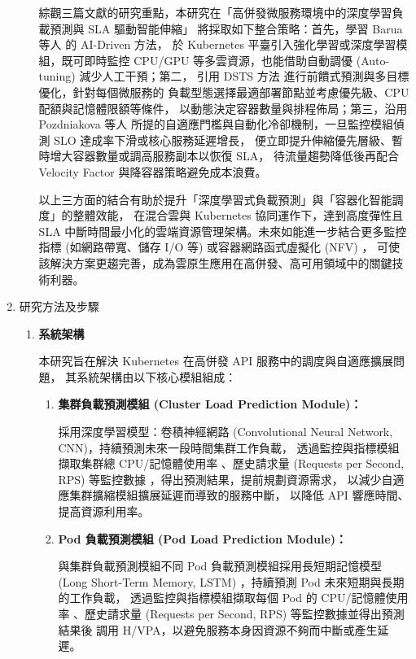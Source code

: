 \documentclass[12pt,a4paper]{article}
\begin{document}
\begin{enumerate}[label={(\zhdig*)}, leftmargin=2\parindent, listparindent=\parindent]
\begin{enumerate}[label={(\arabic*)}, leftmargin=\parindent, listparindent=\parindent]
綜觀三篇文獻的研究重點，本研究在「高併發微服務環境中的深度學習負載預測與 SLA 驅動智能伸縮」
將採取如下整合策略：首先，學習 Barua 等人\cite{22} 的 AI-Driven 方法，
於 Kubernetes 平臺引入強化學習或深度學習模組，既可即時監控 CPU/GPU
等多雲資源，也能借助自動調優 (Auto-tuning) 減少人工干預；第二，
引用 DSTS 方法\cite{24} 進行前饋式預測與多目標優化，針對每個微服務的
負載型態選擇最適部署節點並考慮優先級、CPU 配額與記憶體限額等條件，
以動態決定容器數量與排程佈局；第三，沿用 Pozdniakova 等人\cite{23}
所提的自適應門檻與自動化冷卻機制，一旦監控模組偵測 SLO 達成率下滑或核心服務延遲增長，
便立即提升伸縮優先層級、暫時增大容器數量或調高服務副本以恢復 SLA，
待流量趨勢降低後再配合 Velocity Factor 與降容器策略避免成本浪費。

以上三方面的結合有助於提升「深度學習式負載預測」與「容器化智能調度」的整體效能，
在混合雲與 Kubernetes 協同運作下，達到高度彈性且 SLA
中斷時間最小化的雲端資源管理架構。未來如能進一步結合更多監控指標
(如網路帶寬、儲存 I/O 等) 或容器網路函式虛擬化 (NFV) ，
可使該解決方案更趨完善，成為雲原生應用在高併發、高可用領域中的關鍵技術利器。

\end{enumerate}
\item 研究方法及步驟
\begin{enumerate}[label={(\arabic*)}, leftmargin=\parindent, listparindent=\parindent]

\item \textbf{
系統架構
}

本研究旨在解決 Kubernetes 在高併發 API 服務中的調度與自適應擴展問題，
其系統架構由以下核心模組組成：

\begin{enumerate}[label={(\zhdig*)}, leftmargin=\parindent, listparindent=\parindent]

    \item \textbf{集群負載預測模組 (Cluster Load Prediction Module)：}

        採用深度學習模型：卷積神經網路 (Convolutional Neural Network, CNN)，持續預測未來一段時間集群工作負載，
        透過監控與指標模組擷取集群總 CPU/記憶體使用率
        、歷史請求量 (Requests per Second, RPS) 等監控數據
        ，得出預測結果，提前規劃資源需求，
        以減少自適應集群擴縮模組擴展延遲而導致的服務中斷，
        以降低 API 響應時間、提高資源利用率。

    \item \textbf{Pod 負載預測模組 (Pod Load Prediction Module)：}

        與集群負載預測模組不同 Pod 負載預測模組採用長短期記憶模型 (Long Short-Term Memory, LSTM)
        ，持續預測 Pod 未來短期與長期的工作負載，
        透過監控與指標模組擷取每個 Pod 的 CPU/記憶體使用率
        、歷史請求量 (Requests per Second, RPS) 等監控數據並得出預測結果後
        調用 H/VPA，以避免服務本身因資源不夠而中斷或產生延遲。


\end{enumerate}
\end{enumerate}
\end{enumerate}
\end{document}
